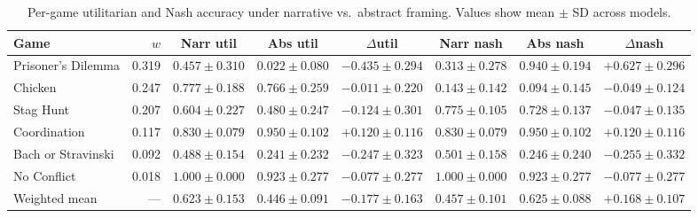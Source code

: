 \begin{table}[ht]
\centering
\small
\caption{Per-game utilitarian and Nash accuracy under narrative vs.\ abstract framing.
Values show mean $\pm$ SD across models.}
\label{tab:rq2-bygame}
\begin{tabular}{lrcccccc}
\toprule
Game & $w$ & Narr util & Abs util & $\Delta$util & Narr nash & Abs nash & $\Delta$nash \\
\midrule
Prisoner's Dilemma & 0.319 & $0.457 \pm 0.310$ & $0.022 \pm 0.080$ & $-0.435 \pm 0.294$ & $0.313 \pm 0.278$ & $0.940 \pm 0.194$ & $+0.627 \pm 0.296$ \\
Chicken & 0.247 & $0.777 \pm 0.188$ & $0.766 \pm 0.259$ & $-0.011 \pm 0.220$ & $0.143 \pm 0.142$ & $0.094 \pm 0.145$ & $-0.049 \pm 0.124$ \\
Stag Hunt & 0.207 & $0.604 \pm 0.227$ & $0.480 \pm 0.247$ & $-0.124 \pm 0.301$ & $0.775 \pm 0.105$ & $0.728 \pm 0.137$ & $-0.047 \pm 0.135$ \\
Coordination & 0.117 & $0.830 \pm 0.079$ & $0.950 \pm 0.102$ & $+0.120 \pm 0.116$ & $0.830 \pm 0.079$ & $0.950 \pm 0.102$ & $+0.120 \pm 0.116$ \\
Bach or Stravinski & 0.092 & $0.488 \pm 0.154$ & $0.241 \pm 0.232$ & $-0.247 \pm 0.323$ & $0.501 \pm 0.158$ & $0.246 \pm 0.240$ & $-0.255 \pm 0.332$ \\
No Conflict & 0.018 & $1.000 \pm 0.000$ & $0.923 \pm 0.277$ & $-0.077 \pm 0.277$ & $1.000 \pm 0.000$ & $0.923 \pm 0.277$ & $-0.077 \pm 0.277$ \\
\midrule
Weighted mean & --- & $0.623 \pm 0.153$ & $0.446 \pm 0.091$ & $-0.177 \pm 0.163$ & $0.457 \pm 0.101$ & $0.625 \pm 0.088$ & $+0.168 \pm 0.107$ \\
\bottomrule
\end{tabular}
\end{table}
